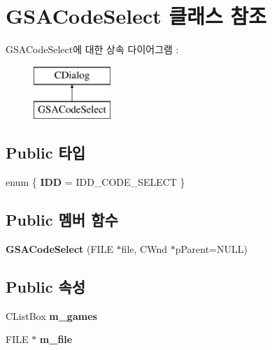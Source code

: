 \hypertarget{class_g_s_a_code_select}{}\section{G\+S\+A\+Code\+Select 클래스 참조}
\label{class_g_s_a_code_select}
G\+S\+A\+Code\+Select에 대한 상속 다이어그램 \+: \begin{figure}[H]
\begin{center}
\leavevmode
\includegraphics[height=2.000000cm]{class_g_s_a_code_select}
\end{center}
\end{figure}
\subsection*{Public 타입}
\begin{DoxyCompactItemize}
\item 
\mbox{\label{class_g_s_a_code_select_a248fc16f816d8ee4cc8e8e16f71a0167}} 
enum \{ {\bfseries I\+DD} = I\+D\+D\+\_\+\+C\+O\+D\+E\+\_\+\+S\+E\+L\+E\+CT
 \}
\end{DoxyCompactItemize}
\subsection*{Public 멤버 함수}
\begin{DoxyCompactItemize}
\item 
\mbox{\label{class_g_s_a_code_select_abe2d23afcbf2fe70e2aaf6ced96c9b1c}} 
{\bfseries G\+S\+A\+Code\+Select} (F\+I\+LE $\ast$file, C\+Wnd $\ast$p\+Parent=N\+U\+LL)
\end{DoxyCompactItemize}
\subsection*{Public 속성}
\begin{DoxyCompactItemize}
\item 
\mbox{\label{class_g_s_a_code_select_a732e7dca958e45d23a1d00234c23c838}} 
C\+List\+Box {\bfseries m\+\_\+games}
\item 
\mbox{\label{class_g_s_a_code_select_a96b171e4976a250bdcac447654cdef12}} 
F\+I\+LE $\ast$ {\bfseries m\+\_\+file}
\end{DoxyCompactItemize}
